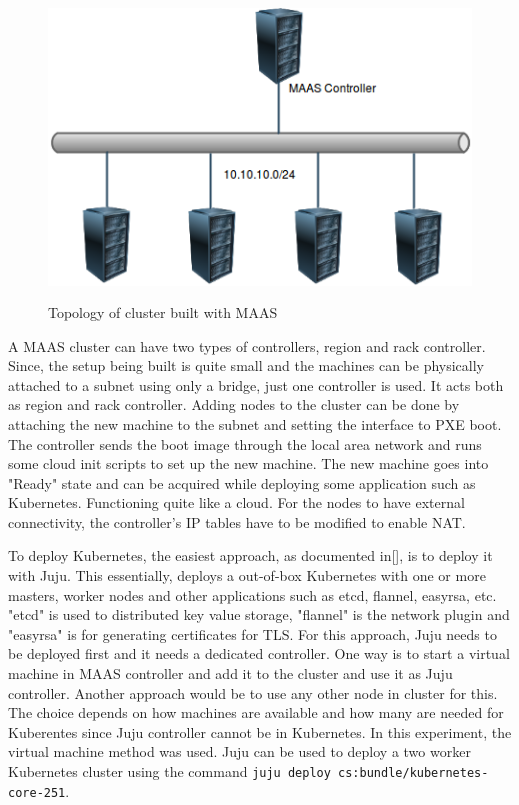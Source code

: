 \documentclass[english, 12pt, a4paper, elec, utf8, a-1b, online]{aaltothesis}
\begin{document}
\begin{figure}[htb]
\begin{center}
\includegraphics[height=8cm]{pics/MAAS-topology.png}
\end{center}
\caption{Topology of cluster built with MAAS}
\label{liitekuva}
\end{figure}

A MAAS cluster can have two types of controllers, region and rack controller. Since, the setup being built is quite small and the machines can be physically attached to a subnet using only a bridge, just one controller is used. It acts both as region and rack controller. Adding nodes to the cluster can be done by attaching the new machine to the subnet and setting the interface to PXE boot. The controller sends the boot image through the local area network and runs some cloud init scripts to set up the new machine. The new machine goes into "Ready" state and can be acquired while deploying some application such as Kubernetes. Functioning quite like a cloud. For the nodes to have external connectivity, the controller's IP tables have to be modified to enable NAT.

To deploy Kubernetes, the easiest approach, as documented in[], is to deploy it with Juju. This essentially, deploys a out-of-box Kubernetes with one or more masters, worker nodes and other applications such as etcd, flannel, easyrsa, etc. "etcd" is used to distributed key value storage, "flannel" is the network plugin and "easyrsa" is for generating certificates for TLS. For this approach, Juju needs to be deployed first and it needs a dedicated controller. One way is to start a virtual machine in MAAS controller and add it to the cluster and use it as Juju controller. Another approach would be to use any other node in cluster for this. The choice depends on how machines are available and how many are needed for Kuberentes since Juju controller cannot be in Kubernetes. In this experiment, the virtual machine method was used. Juju can be used to deploy a two worker Kubernetes cluster using the command \lstinline{juju deploy cs:bundle/kubernetes-core-251}.
\end{document}
